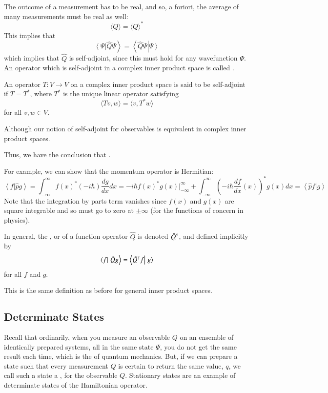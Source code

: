 \documentclass[12pt, a4paper, oneside, openright, titlepage]{book}
\newcommand{\braket}[2]{\left\langle#1\right\vert\left.#2\right\rangle}
\begin{document}
The outcome of a measurement has to be real, and so, a foriori, the average of many measurements must be real as well: $$\langle Q\rangle = \langle Q\rangle^*$$
This implies that $$\braket{\Psi}{\hat{Q}\Psi} = \braket{\hat{Q}\Psi}{\Psi}$$ which implies that $\hat{Q}$ is self-adjoint, since this must hold for any wavefunction $\Psi$. An operator which is self-adjoint in a complex inner product space is called .

\begin{defn}
    An operator $T:V\rightarrow V$ on a complex inner product space is said to be self-adjoint if $T = T^*$, where $T^*$ is the unique linear operator satisfying $$\langle Tv,w\rangle = \langle v,T^*w\rangle$$ for all $v,w \in V$.
\end{defn}
Although our notion of self-adjoint for observables is equivalent in complex inner product spaces.

\begin{rmk}
    Thus, we have the conclusion that .
\end{rmk}

For example, we can show that the momentum operator is Hermitian: $$\braket{f}{\hat{p}g} = \int_{-\infty}^{\infty}f(x)^*(-i\hbar)\frac{dg}{dx}dx = -i\hbar f(x)^*g(x)\Big\rvert_{-\infty}^{\infty} + \int_{-\infty}^{\infty}\left(-i\hbar\frac{df}{dx}(x)\right)^*g(x)dx = \braket{\hat{p}f}{g}$$ Note that the integration by parts term vanishes since $f(x)$ and $g(x)$ are square integrable and so must go to zero at $\pm\infty$ (for the functions of concern in physics). 

\begin{defn}
    In general, the , or  of a function operator $\hat{Q}$ is denoted $\hat{Q}^{\text{\textdagger}}$, and defined implicitly by $$\braket{f}{\hat{Q}g} = \braket{\hat{Q}^{\text{\textdagger}}f}{g}$$ for all $f$ and $g$.
\end{defn}

This is the same definition as before for general inner product spaces.


\subsection{Determinate States}

Recall that ordinarily, when you measure an observable $Q$ on an ensemble of identically prepared systems, all in the same state $\Psi$, you do not get the same result each time, which is the  of quantum mechanics. But, if we can prepare a state such that every measurement $Q$ is certain to return the same value, $q$, we call such a state a , for the observable $Q$. Stationary states are an example of determinate states of the Hamiltonian operator.
\end{document}

